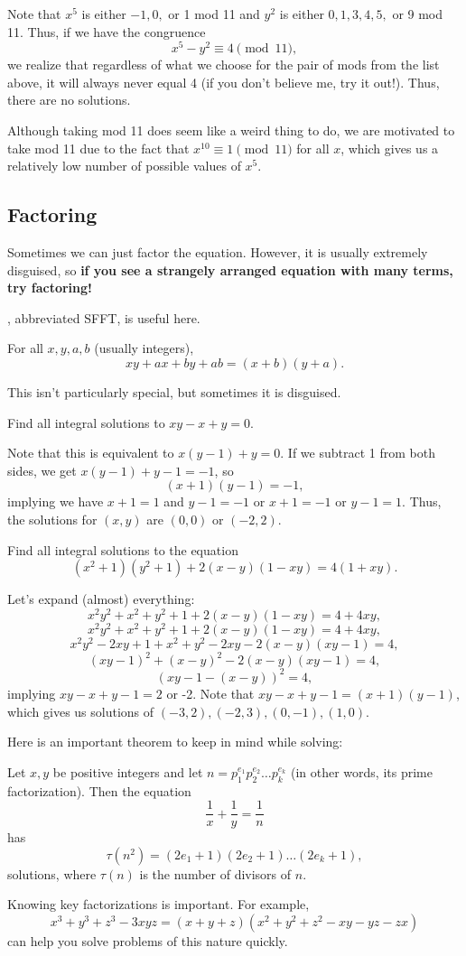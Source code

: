 \documentclass[mast]{lucky}
\begin{document}
\begin{sol}
Note that $x^5$ is either $-1,0,$ or 1 mod 11 and $y^2$ is either $0,1,3,4,5,$ or 9 mod 11. Thus, if we have the congruence
$$x^5-y^2\equiv 4\pmod{11},$$
we realize that regardless of what we choose for the pair of mods from the list above, it will always never equal 4 (if you don't believe me, try it out!). Thus, there are no solutions.
\end{sol}
\begin{remark}
Although taking mod 11 does seem like a weird thing to do, we are motivated to take mod 11 due to the fact that $x^{10}\equiv1\pmod{11}$ for all $x$, which gives us a relatively low number of possible values of $x^5$.
\end{remark}
\subsection{Factoring}
Sometimes we can just factor the equation. However, it is usually extremely disguised, so \textbf{if you see a strangely arranged equation with many terms, try factoring!}

, abbreviated SFFT, is useful here.
\begin{theo}[SFFT]
For all $x,y,a,b$ (usually integers),
$$xy+ax+by+ab=(x+b)(y+a).$$
\end{theo}
This isn't particularly special, but sometimes it is disguised.
\begin{exam}
Find all integral solutions to $xy-x+y=0$.
\end{exam}
\begin{sol}
Note that this is equivalent to $x(y-1)+y=0$. If we subtract 1 from both sides, we get $x(y-1)+y-1=-1$, so
$$(x+1)(y-1)=-1,$$
implying we have $x+1=1$ and $y-1=-1$ or $x+1=-1$ or $y-1=1$. Thus, the solutions for $(x,y)$ are $\boxed{(0,0)}$ or $\boxed{(-2,2)}$.
\end{sol}
\begin{exam}[Titu]
Find all integral solutions to the equation
$$(x^2+1)(y^2+1)+2(x-y)(1-xy)=4(1+xy).$$
\end{exam}
\begin{sol}
Let's expand (almost) everything:
$$x^2y^2+x^2+y^2+1+2(x-y)(1-xy)=4+4xy,$$
$$x^2y^2+x^2+y^2+1+2(x-y)(1-xy)=4+4xy,$$
$$x^2y^2-2xy+1+x^2+y^2-2xy-2(x-y)(xy-1)=4,$$
$$(xy-1)^2+(x-y)^2-2(x-y)(xy-1)=4,$$
$$(xy-1-(x-y))^2=4,$$
implying $xy-x+y-1=2$ or -2. Note that $xy-x+y-1=(x+1)(y-1)$, which gives us solutions of $\boxed{(-3,2),(-2,3),(0,-1),(1,0)}$.
\end{sol}
Here is an important theorem to keep in mind while solving:
\begin{theo}
Let $x,y$ be positive integers and let $n=p_1^{e_1}p_2^{e_2}\ldots p_k^{e_k}$ (in other words, its prime factorization). Then the equation
$$\frac{1}{x}+\frac{1}{y}=\frac{1}{n}$$
has
$$\tau(n^2) = (2e_1+1)(2e_2+1)\ldots(2e_k+1),$$
solutions, where $\tau(n)$ is the number of divisors of $n$.
\end{theo}
Knowing key factorizations is important. For example,
$$x^3+y^3+z^3-3xyz=(x+y+z)(x^2+y^2+z^2-xy-yz-zx)$$
can help you solve problems of this nature quickly.
\end{document}
